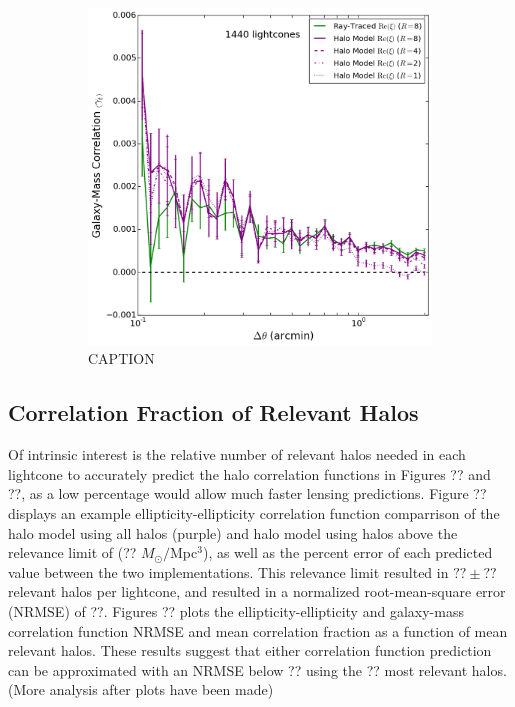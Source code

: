 \documentclass[%
 reprint,
 amsmath,amssymb,
 aps,nofootinbib
]{revtex4-1}
\begin{document}
\begin{figure}
\begin{subfigure}{0.475\textwidth}
        \includegraphics[width=\textwidth]{figs-swe/thesis/ng_progression.png}
        \captionsetup{justification=raggedright,singlelinecheck=false}
        \caption{CAPTION}
        \label{ng_corr_series}
    \end{subfigure}
    \caption{}
\end{figure}
%

\subsection{Correlation Fraction of Relevant Halos} \label{halo_fraction}

Of intrinsic interest is the relative number of relevant halos needed in each lightcone to accurately predict the halo correlation functions in Figures ?? and ??, as a low percentage would allow much faster lensing predictions. Figure ?? displays an example ellipticity-ellipticity correlation function comparrison of the halo model using all halos (purple) and halo model using halos above the relevance limit of (?? $M_{\odot}/$Mpc$^3$), as well as the percent error of each predicted value between the two implementations. This relevance limit resulted in $??\pm??$ relevant halos per lightcone, and resulted in a normalized root-mean-square error (NRMSE) of ??. Figures ?? plots the ellipticity-ellipticity and galaxy-mass correlation function NRMSE and mean correlation fraction as a function of mean relevant halos. These results suggest that either correlation function prediction can be approximated with an NRMSE below ?? using the ?? most relevant halos. (More analysis after plots have been made)
\end{document}
